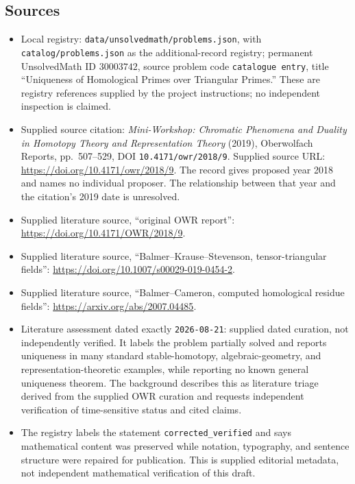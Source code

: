 \documentclass[11pt]{article}
\begin{document}
\subsection{Sources}
\begin{itemize}
\item Local registry: \texttt{data/unsolvedmath/problems.json}, with \texttt{catalog/problems.json} as the additional-record registry; permanent UnsolvedMath ID \(30003742\), source problem code \texttt{catalogue entry}, title ``Uniqueness of Homological Primes over Triangular Primes.'' These are registry references supplied by the project instructions; no independent inspection is claimed.
\item Supplied source citation: \emph{Mini-Workshop: Chromatic Phenomena and Duality in Homotopy Theory and Representation Theory} (2019), Oberwolfach Reports, pp.~507--529, DOI \texttt{10.4171/owr/2018/9}. Supplied source URL: \url{https://doi.org/10.4171/owr/2018/9}. The record gives proposed year 2018 and names no individual proposer. The relationship between that year and the citation's 2019 date is unresolved.
\item Supplied literature source, ``original OWR report'': \url{https://doi.org/10.4171/OWR/2018/9}.
\item Supplied literature source, ``Balmer--Krause--Stevenson, tensor-triangular fields'': \url{https://doi.org/10.1007/s00029-019-0454-2}.
\item Supplied literature source, ``Balmer--Cameron, computed homological residue fields'': \url{https://arxiv.org/abs/2007.04485}.
\item Literature assessment dated exactly \texttt{2026-08-21}: supplied dated curation, not independently verified. It labels the problem partially solved and reports uniqueness in many standard stable-homotopy, algebraic-geometry, and representation-theoretic examples, while reporting no known general uniqueness theorem. The background describes this as literature triage derived from the supplied OWR curation and requests independent verification of time-sensitive status and cited claims.
\item The registry labels the statement \texttt{corrected\_verified} and says mathematical content was preserved while notation, typography, and sentence structure were repaired for publication. This is supplied editorial metadata, not independent mathematical verification of this draft.
\end{itemize}
\end{document}
